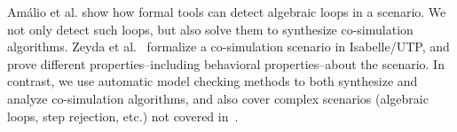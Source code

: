 Am\'alio et al. \cite{Amalio2016} show how  formal
tools can detect  algebraic loops in a scenario. We not only detect
such loops, but also solve them to synthesize co-simulation
algorithms.  
Zeyda et al.~\cite{cerone_formalising_2018}  formalize a co-simulation scenario in Isabelle/UTP, and   prove
different properties--including behavioral properties--about the
scenario.
In contrast, we use automatic model checking  methods to both
synthesize and analyze co-simulation algorithms, and also cover
complex scenarios (algebraic loops, step rejection, etc.) not covered
in~\cite{cerone_formalising_2018}. 


